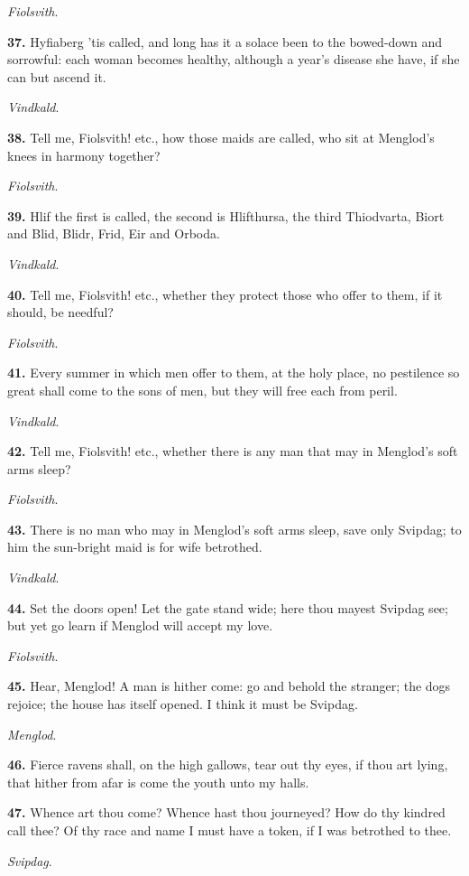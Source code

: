 \emph{Fiolsvith}.

\textbf{37.} Hyfiaberg 'tis called, and long has it a solace been to the
bowed-down and sorrowful: each woman becomes healthy, although a
year's disease she have, if she can but ascend it.

\emph{Vindkald}.

\textbf{38.} Tell me, Fiolsvith! etc., how those maids are called, who sit at
Menglod's knees in harmony together?

\emph{Fiolsvith}.

\textbf{39.} Hlif the first is called, the second is Hlifthursa, the third
Thiodvarta, Biort and Blid, Blidr, Frid, Eir and Orboda.

\emph{Vindkald}.

\textbf{40.} Tell me, Fiolsvith! etc., whether they protect those who offer
to them, if it should, be needful?

\emph{Fiolsvith}.

\textbf{41.} Every summer in which men offer to them, at the holy place, no
pestilence so great shall come to the sons of men, but they will free
each from peril.

\emph{Vindkald}.

\textbf{42.} Tell me, Fiolsvith! etc., whether there is any man that may in
Menglod's soft arms sleep?

\emph{Fiolsvith}.

\textbf{43.} There is no man who may in Menglod's soft arms sleep, save only
Svipdag; to him the sun-bright maid is for wife betrothed.

\emph{Vindkald}.

\textbf{44.} Set the doors open! Let the gate stand wide; here thou mayest
Svipdag see; but yet go learn if Menglod will accept my love.

\emph{Fiolsvith}.

\textbf{45.} Hear, Menglod! A man is hither come: go and behold the stranger;
the dogs rejoice; the house has itself opened. I think it must be
Svipdag.

\emph{Menglod}.

\textbf{46.} Fierce ravens shall, on the high gallows, tear out thy eyes, if
thou art lying, that hither from afar is come the youth unto my halls.

\textbf{47.} Whence art thou come? Whence hast thou journeyed? How do thy
kindred call thee? Of thy race and name I must have a token, if I was
betrothed to thee.

\emph{Svipdag}.

